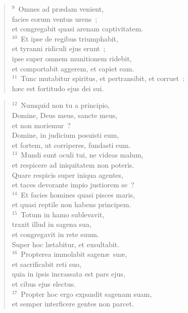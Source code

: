 \begin{flushleft}
\begin{verse}
${}^{9}$~Omnes ad pr\ae dam venient,\\ facies eorum ventus urens~;\\ et congregabit quasi arenam captivitatem.\\
${}^{10}$~Et ipse de regibus triumphabit,\\ et tyranni ridiculi ejus erunt~;\\ ipse super omnem munitionem ridebit,\\ et comportabit aggerem, et capiet eam.\\
${}^{11}$~Tunc mutabitur spiritus, et pertransibit, et corruet~:\\ h\ae c est fortitudo ejus dei sui.\end{verse}\end{flushleft}


\begin{flushleft}\begin{verse}${}^{12}$~Numquid non tu a principio,\\ Domine, Deus meus, sancte meus,\\ et non moriemur~?\\ Domine, in judicium posuisti eum,\\ et fortem, ut corriperes, fundasti eum.\\
${}^{13}$~Mundi sunt oculi tui, ne videas malum,\\ et respicere ad iniquitatem non poteris.\\ Quare respicis super iniqua agentes,\\ et taces devorante impio justiorem se~?\\
${}^{14}$~Et facies homines quasi pisces maris,\\ et quasi reptile non habens principem.\\
${}^{15}$~Totum in hamo sublevavit,\\ traxit illud in sagena sua,\\ et congregavit in rete suum.\\ Super hoc l\ae tabitur, et exsultabit.\\
${}^{16}$~Propterea immolabit sagen\ae\ su\ae ,\\ et sacrificabit reti suo,\\ quia in ipsis incrassata est pars ejus,\\ et cibus ejus electus.\\
${}^{17}$~Propter hoc ergo expandit sagenam suam,\\ et semper interficere gentes non parcet.\end{verse}\end{flushleft}


